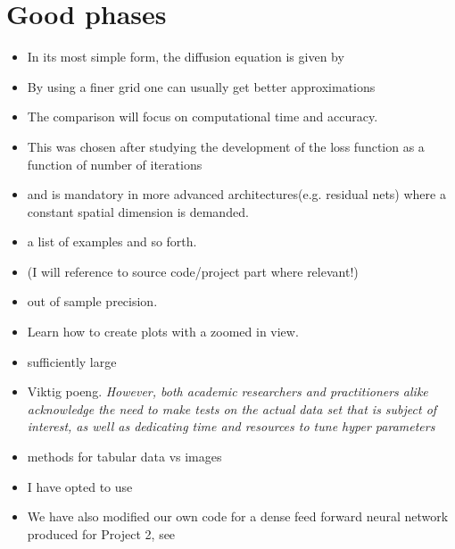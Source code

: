 \section{Good phases}
\begin{itemize}
    \item  In its most simple form, the diffusion equation is given by
    \item By using a finer grid one can usually get better approximations
    \item The comparison will focus on computational time and accuracy.
    \item This was chosen after
studying the development of the loss function as a function of number of iterations
    \item and is mandatory in
more advanced architectures(e.g. residual nets) where a constant spatial
dimension is demanded.
    \item a list of examples and so forth.
    \item (I will reference to source code/project part where relevant!)
    \item out of sample precision.
    \item Learn how to create plots with a zoomed in view.
    \item sufficiently large
    \item Viktig poeng. \textit{However, both academic
researchers and practitioners alike acknowledge the
need to make tests on the actual data set that is
subject of interest, as well as dedicating time and
resources to tune hyper parameters}
    \item methods for tabular data vs images
    \item I have opted to use
    \item We have also modified our own code for a dense feed forward neural
network produced for Project 2, see

\end{itemize}
